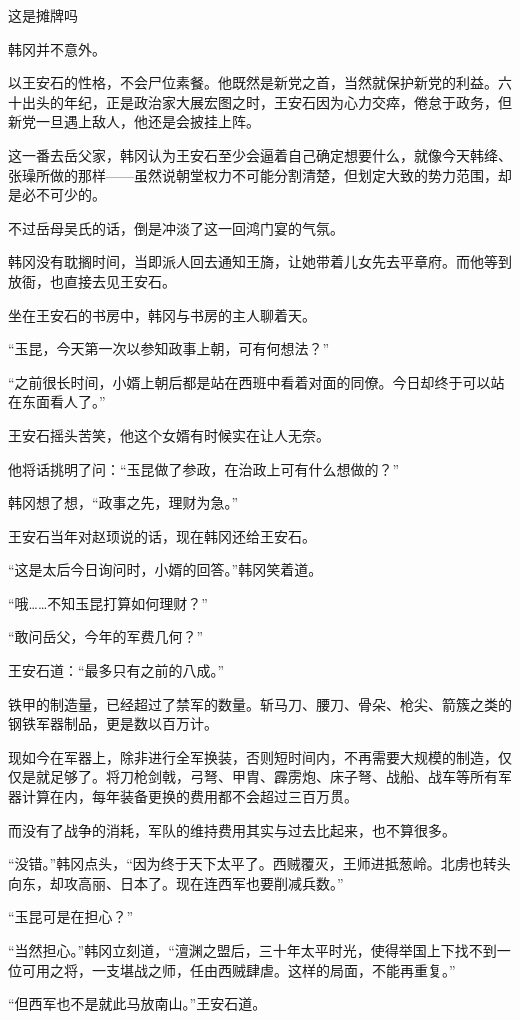 这是摊牌吗

韩冈并不意外。

以王安石的性格，不会尸位素餐。他既然是新党之首，当然就保护新党的利益。六十出头的年纪，正是政治家大展宏图之时，王安石因为心力交瘁，倦怠于政务，但新党一旦遇上敌人，他还是会披挂上阵。

这一番去岳父家，韩冈认为王安石至少会逼着自己确定想要什么，就像今天韩绛、张璪所做的那样——虽然说朝堂权力不可能分割清楚，但划定大致的势力范围，却是必不可少的。

不过岳母吴氏的话，倒是冲淡了这一回鸿门宴的气氛。

韩冈没有耽搁时间，当即派人回去通知王旖，让她带着儿女先去平章府。而他等到放衙，也直接去见王安石。

坐在王安石的书房中，韩冈与书房的主人聊着天。

“玉昆，今天第一次以参知政事上朝，可有何想法？”

“之前很长时间，小婿上朝后都是站在西班中看着对面的同僚。今日却终于可以站在东面看人了。”

王安石摇头苦笑，他这个女婿有时候实在让人无奈。

他将话挑明了问：“玉昆做了参政，在治政上可有什么想做的？”

韩冈想了想，“政事之先，理财为急。”

王安石当年对赵顼说的话，现在韩冈还给王安石。

“这是太后今日询问时，小婿的回答。”韩冈笑着道。

“哦……不知玉昆打算如何理财？”

“敢问岳父，今年的军费几何？”

王安石道：“最多只有之前的八成。”

铁甲的制造量，已经超过了禁军的数量。斩马刀、腰刀、骨朵、枪尖、箭簇之类的钢铁军器制品，更是数以百万计。

现如今在军器上，除非进行全军换装，否则短时间内，不再需要大规模的制造，仅仅是就足够了。将刀枪剑戟，弓弩、甲胄、霹雳炮、床子弩、战船、战车等所有军器计算在内，每年装备更换的费用都不会超过三百万贯。

而没有了战争的消耗，军队的维持费用其实与过去比起来，也不算很多。

“没错。”韩冈点头，“因为终于天下太平了。西贼覆灭，王师进抵葱岭。北虏也转头向东，却攻高丽、日本了。现在连西军也要削减兵数。”

“玉昆可是在担心？”

“当然担心。”韩冈立刻道，“澶渊之盟后，三十年太平时光，使得举国上下找不到一位可用之将，一支堪战之师，任由西贼肆虐。这样的局面，不能再重复。”

“但西军也不是就此马放南山。”王安石道。

